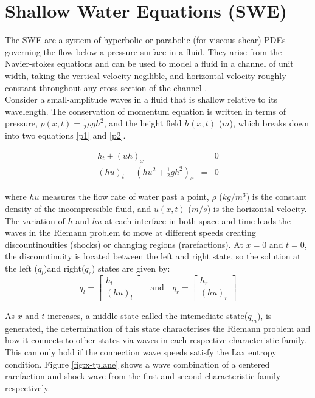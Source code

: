 \documentclass[12pt,a4paper]{article}
\begin{document}
		\section{Shallow Water Equations (SWE)}
	The SWE are a system of hyperbolic or parabolic (for viscous shear) PDEs governing the flow below a pressure surface in a fluid. They arise from the Navier-stokes equations and can be used to model a fluid in a channel of unit width, taking the vertical velocity negilible, and horizontal velocity roughly constant throughout any cross section of the channel \cite{ge:2008}.  \\
	
	\noindent Consider a small-amplitude waves in a fluid that is shallow relative to its wavelength. The conservation of momentum equation is written in terms of pressure, $p(x,t) = \frac{1}{2}\rho gh^{2}$, and the height field $h(x,t)$ ($m$), which breaks down into two equations \eqref{p1} and \eqref{p2}.
	
	\begin{eqnarray}
		h_{t} + (uh)_x &=& 0
		\label{p1} \\
		(hu)_t + \left(hu^{2} + \frac{1}{2}gh^{2} \right)_x &=& 0
		\label{p2}
	\end{eqnarray}	
	
	\noindent where $hu$ measures the flow rate of water past a point,  $\rho$ ($kg/m^3$) is the constant density of the incompressible fluid, and $u(x,t)$ ($m/s$) is the horizontal velocity.\\
	
	\noindent The variation of $h$ and $hu$ at each interface in both space and time leads the waves in the Riemann problem to move at different speeds creating discountinouities (shocks) or changing regions (rarefactions).  At $x = 0$ and $t = 0$,   the discountinuity is located between the left and right state, so the solution at the left ($q_{l}$)and right($q_{r}$) states are given by: 
	\begin{equation}
		q_{l} = \begin{bmatrix}
	h_{l} \\( hu)_{l}
		\end{bmatrix}  \quad \text{and} \quad q_{r} = \begin{bmatrix}
		h_{r} \\( hu)_{r}
	\end{bmatrix} 
	\end{equation}
	
	\noindent As $x$ and $t$ increases, a middle state called the intemediate state($q_{m}$), is generated, the determination of this state characterises the Riemann problem and how it connects to other states via waves in each respective characteristic family\cite{ba-le-mi-ro:2003}.  This can only hold if the connection wave speeds satisfy the Lax entropy condition. Figure \ref{fig:x-tplane} shows a wave combination of a centered rarefaction  and shock wave from the first and second characteristic family respectively.
	  
\end{document}
